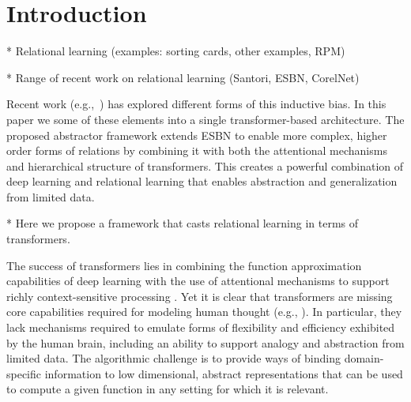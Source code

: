 \section{Introduction}
\label{sec:intro}

* Relational learning (examples: sorting cards, other examples, RPM)

* Range of recent work on relational learning (Santori, ESBN, CorelNet)

Recent work (e.g.,~\cite{TEM, NTM,episodicControl,esbn,mondal23learned,musslick2021rationalizing}) 
has explored different forms of this inductive bias. In this paper we some of these elements into a single 
transformer-based architecture. The proposed abstractor framework extends ESBN to enable more complex, higher order forms of relations by combining it with both the attentional mechanisms and hierarchical structure of transformers. This creates a powerful combination of deep learning and relational learning that enables abstraction and generalization from limited data.


* Here we propose a framework that casts relational learning in terms of transformers. 

The success of transformers lies in combining the function approximation capabilities of deep learning with the use of attentional mechanisms to support richly context-sensitive processing \citep{transformers,vaswani2017attention,kerg2020untangling}. Yet it is clear that transformers are missing core capabilities required for modeling human thought (e.g., \cite{mahowald2023dissociating}).  In particular, they lack mechanisms required to emulate forms of flexibility and efficiency exhibited by the human brain, including an ability to support analogy and abstraction from limited data. The algorithmic challenge is to provide ways of binding domain-specific information to low dimensional, abstract representations that can be used to compute a given function in any setting for which it is relevant. 

